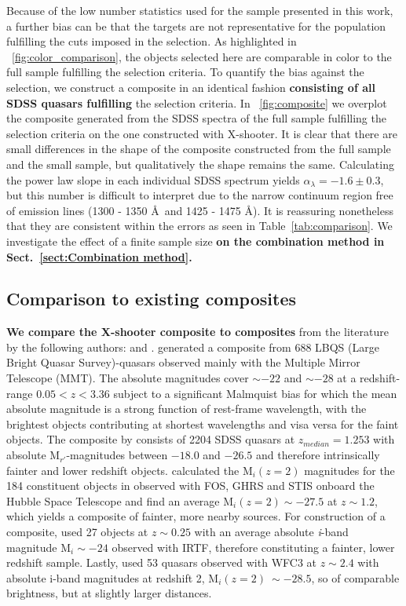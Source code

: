 \documentclass{aa}    %
\newcommand{\figref}[1]{\ref{fig:#1}}
\newcommand{\Fig}[1]{\figurename~\figref{#1}}
\newcommand{\fig}[1]{\Fig{#1}}
\newcommand{\Tab}[1]{Table~\ref{tab:#1}}
\newcommand{\tab}[1]{\Tab{#1}}
\newcommand{\sectionname}{Sect.}
\newcommand{\Sect}[1]{\sectionname~\ref{sect:#1}}
\newcommand{\sect}[1]{\Sect{#1}}
\newcommand{\sectlabel}[1]{\label{sect:#1}}
\begin{document}
Because of the low number statistics used for the sample presented in this work, a
further bias can be that the targets are not representative for the
population fulfilling the cuts imposed in the selection. As
highlighted in \fig{color_comparison}, the objects selected here are comparable in color to the full sample fulfilling the selection criteria. To
quantify the bias against the selection, we construct a composite in
an identical fashion \textbf{consisting of all SDSS quasars fulfilling} the
selection criteria.  In \fig{composite} we overplot the composite
generated from the SDSS spectra of the full sample fulfilling the
selection criteria on the one constructed with X-shooter. It is clear
that there are small differences in the shape of the composite
constructed from the full sample and the small sample, but
qualitatively the shape remains the same. Calculating the power law
slope in each individual SDSS spectrum yields $\alpha_\lambda = -1.6\pm 0.3$,
but this number is difficult to interpret due to the narrow continuum
region free of emission lines (1300 - 1350 \AA~and 1425 - 1475
\AA). It is reassuring nonetheless that they are consistent within the
errors as seen in \tab{comparison}. We investigate the effect of a
finite sample size \textbf{on the combination method in \sect{Combination method}.}


\subsection{Comparison to existing composites} \sectlabel{comparison}
\textbf{We compare the X-shooter composite to composites} from the literature by the following authors:
\citet{Francis1991, VandenBerk2001, Telfer2002, Glikman2006} and
\citet{Lusso2015}. \citet{Francis1991} generated a composite from 688
LBQS (Large Bright Quasar Survey)-quasars observed mainly with the Multiple Mirror Telescope (MMT). The absolute magnitudes cover $\sim -22$
and $\sim -28$ at a redshift-range $0.05 < z < 3.36$ subject to a
significant Malmquist bias for which the mean absolute magnitude is a
strong function of rest-frame wavelength, with the brightest objects
contributing at shortest wavelengths and visa versa for the faint
objects. The composite by \citet{VandenBerk2001} consists of 2204 SDSS
quasars at $z_{median} = 1.253$ with absolute M$_{r'}$-magnitudes
between $-18.0$ and $-26.5$ and therefore intrinsically fainter and
lower redshift objects. \citet{Lusso2015} calculated the M$_i(z=2)$
magnitudes for the 184 constituent objects in \citet{Telfer2002}
observed with FOS, GHRS and STIS onboard the Hubble Space Telescope and find an average
M$_i(z=2) \sim -27.5$ at $z \sim 1.2$, which yields a composite of
fainter, more nearby sources. For construction of a composite,
\citet{Glikman2006} used 27 objects at $z \sim 0.25$ with an average
absolute \textit{i}-band magnitude M$_i \sim -24$ observed with IRTF,
therefore constituting a fainter, lower redshift sample. Lastly,
\citet{Lusso2015} used 53 quasars observed with WFC3 at $z \sim 2.4$
with absolute i-band magnitudes at redshift 2, M$_i(z=2) ~\sim -28.5$,
so of comparable brightness, but at slightly larger distances.
\end{document}
